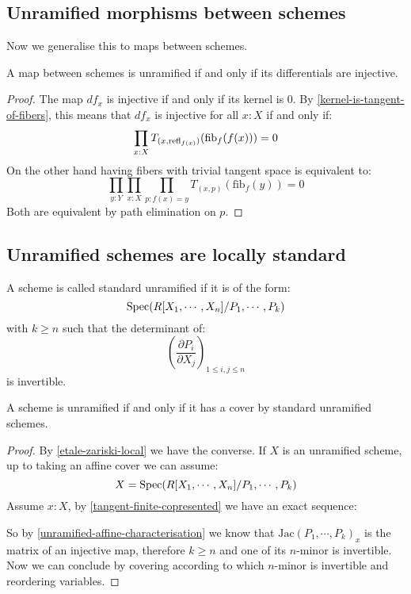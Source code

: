 \subsection{Unramified morphisms between schemes}

Now we generalise this to maps between schemes.

\begin{proposition}\label{unramified-map-characterisation}
A map between schemes is unramified if and only if its differentials are injective. 
\end{proposition}

\begin{proof}
The map $df_x$ is injective if and only if its kernel is $0$. By \cref{kernel-is-tangent-of-fibers}, this means that $df_x$ is injective for all $x:X$ if and only if:
\[
\prod_{x:X}T_{(x,\mathrm{refl}_{f(x)})}(\mathrm{fib}_f(f(x)))=0
\]
On the other hand having fibers with trivial tangent space is equivalent to:
\[
\prod_{y:Y}\prod_{x:X}\prod_{p:f(x)=y} T_{(x,p)}(\mathrm{fib}_f(y)) = 0
\]
Both are equivalent by path elimination on $p$.
\end{proof}


\subsection{Unramified schemes are locally standard}

\begin{definition}
A scheme is called standard unramified if it is of the form:
\[\operatorname{Spec}(R[X_1,\cdots,X_n]/P_1,\cdots,P_k)\]
with $k\geq n$ such that the determinant of:
\[\left( \frac{\partial P_i}{\partial X_j}\right)_{1\leq i,j\leq n}\]
is invertible.
\end{definition}

\begin{proposition}
A scheme is unramified if and only if it has a cover by standard unramified schemes.
\end{proposition}

\begin{proof}
By \cref{etale-zariski-local} we have the converse. If $X$ is an unramified scheme, up to taking an affine cover we can assume:
\[X = \operatorname{Spec}(R[X_1,\cdots,X_n]/P_1,\cdots,P_k)\]
Assume $x:X$, by \cref{tangent-finite-copresented} we have an exact sequence: 
\begin{center}
\end{center}
So by \cref{unramified-affine-characterisation} we know that $\mathrm{Jac}(P_1,\cdots,P_k)_{x}$ is the matrix of an injective map, therefore $k\geq n$ and one of its $n$-minor is invertible. Now we can conclude by covering according to which $n$-minor is invertible and reordering variables.
\end{proof}


